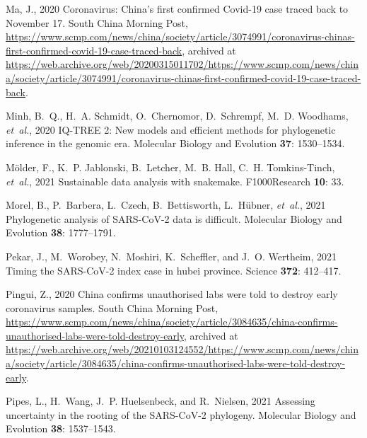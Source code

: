 \documentclass[9pt,twocolumn,twoside]{gsajnl_modified}
\begin{document}
\begin{thebibliography}{47}
{Ma, J.}, 2020 {Coronavirus: China’s first confirmed Covid-19 case traced
  back to November 17}. South China Morning Post,
  \url{https://www.scmp.com/news/china/society/article/3074991/coronavirus-chinas-first-confirmed-covid-19-case-traced-back},
  archived at
  \url{https://web.archive.org/web/20200315011702/https://www.scmp.com/news/china/society/article/3074991/coronavirus-chinas-first-confirmed-covid-19-case-traced-back}.

{Minh, B.~Q., H.~A. Schmidt, O.~Chernomor, D.~Schrempf, M.~D. Woodhams, {\em
  et~al.\/}}, 2020 {IQ-TREE} 2: New models and efficient methods for
  phylogenetic inference in the genomic era. Molecular Biology and Evolution
  {\bf 37}: 1530--1534.

{M{\"o}lder, F., K.~P. Jablonski, B.~Letcher, M.~B. Hall, C.~H. Tomkins-Tinch,
  {\em et~al.\/}}, 2021 Sustainable data analysis with snakemake. F1000Research
  {\bf 10}: 33.

{Morel, B., P.~Barbera, L.~Czech, B.~Bettisworth, L.~H{\"u}bner, {\em
  et~al.\/}}, 2021 Phylogenetic analysis of {SARS-CoV-2} data is difficult.
  Molecular Biology and Evolution {\bf 38}: 1777--1791.

{Pekar, J., M.~Worobey, N.~Moshiri, K.~Scheffler, {\rm and} J.~O. Wertheim},
  2021 Timing the {SARS-CoV-2} index case in hubei province. Science {\bf 372}:
  412--417.

{Pingui, Z.}, 2020 China confirms unauthorised labs were told to destroy early
  coronavirus samples. South China Morning Post,
  \url{https://www.scmp.com/news/china/society/article/3084635/china-confirms-unauthorised-labs-were-told-destroy-early},
  archived at
  \url{https://web.archive.org/web/20210103124552/https://www.scmp.com/news/china/society/article/3084635/china-confirms-unauthorised-labs-were-told-destroy-early}.

{Pipes, L., H.~Wang, J.~P. Huelsenbeck, {\rm and} R.~Nielsen}, 2021 Assessing
  uncertainty in the rooting of the {SARS-CoV-2} phylogeny. Molecular Biology
  and Evolution {\bf 38}: 1537--1543.


\end{thebibliography}
\end{document}
